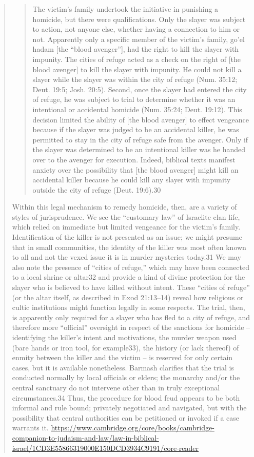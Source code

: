 \documentclass[11pt]{article}
\begin{document}
{\begin{quote}
\begin{quote}
The victim’s family undertook the initiative in punishing a homicide, but there were qualifications. Only the slayer was subject to action, not anyone else, whether having a connection to him or not. Apparently only a specific member of the victim’s family, go’el hadam [the “blood avenger”], had the right to kill the slayer with impunity. The cities of refuge acted as a check on the right of [the blood avenger] to kill the slayer with impunity. He could not kill a slayer while the slayer was within the city of refuge (Num. 35:12; Deut. 19:5; Josh. 20:5). Second, once the slayer had entered the city of refuge, he was subject to trial to determine whether it was an intentional or accidental homicide (Num. 35:24; Deut. 19:12). This decision limited the ability of [the blood avenger] to effect vengeance because if the slayer was judged to be an accidental killer, he was permitted to stay in the city of refuge safe from the avenger. Only if the slayer was determined to be an intentional killer was he handed over to the avenger for execution. Indeed, biblical texts manifest anxiety over the possibility that [the blood avenger] might kill an accidental killer because he could kill any slayer with impunity outside the city of refuge (Deut. 19:6).30 
\end{quote}

Within this legal mechanism to remedy homicide, then, are a variety of styles of jurisprudence. We see the “customary law” of Israelite clan life, which relied on immediate but limited vengeance for the victim’s family. Identification of the killer is not presented as an issue; we might presume that in small communities, the identity of the killer was most often known to all and not the vexed issue it is in murder mysteries today.31 We may also note the presence of “cities of refuge,” which may have been connected to a local shrine or altar32 and provide a kind of divine protection for the slayer who is believed to have killed without intent. These “cities of refuge” (or the altar itself, as described in Exod 21:13–14) reveal how religious or cultic institutions might function legally in some respects. The trial, then, is apparently only required for a slayer who has fled to a city of refuge, and therefore more “official” oversight in respect of the sanctions for homicide – identifying the killer’s intent and motivations, the murder weapon used (bare hands or iron tool, for example33), the history (or lack thereof) of enmity between the killer and the victim – is reserved for only certain cases, but it is available nonetheless. Barmash clarifies that the trial is conducted normally by local officials or elders; the monarchy and/or the central sanctuary do not intervene other than in truly exceptional circumstances.34 Thus, the procedure for blood feud appears to be both informal and rule bound; privately negotiated and navigated, but with the possibility that central authorities can be petitioned or invoked if a case warrants it.
\url{https://www.cambridge.org/core/books/cambridge-companion-to-judaism-and-law/law-in-biblical-israel/1CD3E55866319000E150DCD3934C9191/core-reader}
\end{quote}

}
\end{document}
